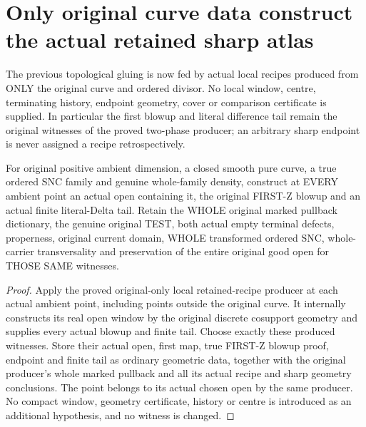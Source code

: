 \section{Only original curve data construct the actual retained sharp atlas}

The previous topological gluing is now fed by actual local recipes produced
from ONLY the original curve and ordered divisor. No local window, centre,
terminating history, endpoint geometry, cover or comparison certificate is
supplied. In particular the first blowup and literal difference tail remain
the original witnesses of the proved two-phase producer; an arbitrary sharp
endpoint is never assigned a recipe retrospectively.

\begin{theorem}
\label{hir:sharp-actual-original-retained-local-recipe-family}
\leanok
{}
For original positive ambient dimension, a closed smooth pure curve, a true
ordered SNC family and genuine whole-family density, construct at EVERY
ambient point an actual open containing it, the original FIRST-Z blowup and
an actual finite literal-Delta tail. Retain the WHOLE original marked
pullback dictionary, the genuine original TEST, both actual empty terminal
defects, properness, original current domain, WHOLE transformed ordered SNC,
whole-carrier transversality and preservation of the entire original good
open for THOSE SAME witnesses.
\end{theorem}
\begin{proof}
Apply the proved original-only local retained-recipe producer at each actual
ambient point, including points outside the original curve. It internally
constructs its real open window by the original discrete cosupport geometry
and supplies every actual blowup and finite tail. Choose exactly these
produced witnesses. Store their actual open, first map, true FIRST-Z blowup
proof, endpoint and finite tail as ordinary geometric data, together with
the original producer's whole marked pullback and all its actual recipe and
sharp geometry conclusions. The point belongs to its actual chosen open by
the same producer. No compact window, geometry certificate, history or
centre is introduced as an additional hypothesis, and no witness is changed.
\end{proof}

